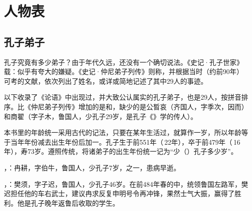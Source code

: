 \chapter*{人\quad 物\quad 表}



\lypdfbookmark\section*{孔子弟子}

孔子究竟有多少弟子？由于年代久远，还没有一个确切说法。《史记·孔子世家》载：似乎有夸大的嫌疑。《史记·仲尼弟子列传》则称，并根据当时（约前90年）可考的文献，依次列出了姓名，或详或简地记述了其中29人的事迹。

以下收录了《论语》中出现过，并大致公认属实的孔子弟子，也是29人，按拼音排序。比《仲尼弟子列传》增加的是和，缺少的是公晳哀（齐国人，字季次，因而）和商翟（字子木，鲁国人，少孔子29岁，是孔子《》学的传人）。

本书里的年龄统一采用古代的记法，只要在某年生活过，就算作一岁，所以年龄等于当年年份减去出生年份后加一。孔子生于前551年（\,22年），卒于前479年（\,16年），寿73岁。遵照传统，将诸弟子的出生年份统一记为“少（）孔子多少岁”。

\bigskip

，：冉耕，字伯牛，鲁国人，少孔子7岁，之一，患病早逝。%

，：樊须，字子迟，鲁国人，少孔子46岁。在前484年春的中，统领鲁国左路军，樊迟担任他的车右武士，建议冉求反复申明号令再冲锋，果然士气大振，赢得了胜利。他是孔子晚年返鲁后收取的学生。%

